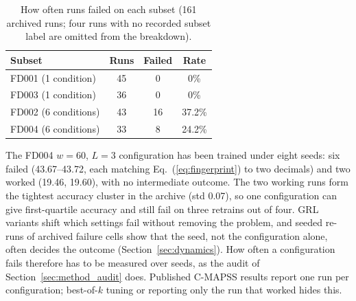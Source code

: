 \begin{table}[t]
\centering\footnotesize
\caption{How often runs failed on each subset (161 archived runs; four runs
with no recorded subset label are omitted from the breakdown).}
\label{tab:prevalence}
\begin{tabularx}{\linewidth}{Xccc}
\toprule
Subset & Runs & Failed & Rate \\
\midrule
FD001 (1 condition) & 45 & 0 & 0\% \\
FD003 (1 condition) & 36 & 0 & 0\% \\
FD002 (6 conditions) & 43 & 16 & 37.2\% \\
FD004 (6 conditions) & 33 & 8 & 24.2\% \\
\bottomrule
\end{tabularx}
\end{table}

The FD004 $w{=}60$, $L{=}3$ configuration has been trained under eight seeds:
six failed (43.67--43.72, each matching Eq.~(\ref{eq:fingerprint}) to two
decimals) and two worked (19.46, 19.60), with no intermediate outcome. The
two working runs form the tightest accuracy cluster in the archive (std
0.07), so one configuration can give first-quartile accuracy and still fail
on three retrains out of four. GRL variants shift which settings fail
without removing the problem, and seeded re-runs of archived failure cells
show that the seed, not the configuration alone, often decides the outcome
(Section~\ref{sec:dynamics}). How often a configuration fails therefore has
to be measured over seeds, as the audit of Section~\ref{sec:method_audit}
does. Published C-MAPSS results report one run per configuration;
best-of-$k$ tuning or reporting only the run that worked hides this.
